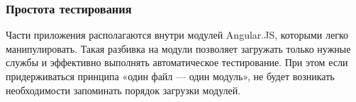\subsubsection*{Простота тестирования}
Части приложения располагаются внутри модулей Angular.JS, которыми легко манипулировать.
Такая разбивка на модули позволяет загружать только нужные службы и эффективно выполнять
автоматическое тестирование. При этом если придерживаться принципа «один файл — один модуль»,
не будет возникать необходимости запоминать порядок загрузки модулей.
